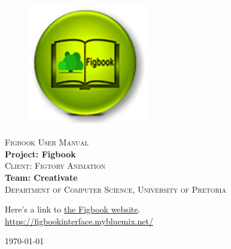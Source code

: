 \begin{titlepage}
	\begin{center}
		
		\begin{figure}[t]
			\centering
			\includegraphics[width=200px]{images/figbooklogo-u216.png}
		\end{figure}
		
		\textsc{\Huge Figbook User Manual} \\ 
		\vspace{2cm}
		\textbf{\Large Project: Figbook} \\ 
		\textsc{\small Client: Figtory Animation} \\ 
		\vspace{2cm}
		\textbf{\large Team: Creativate } \\ 
		
		\textsc{\small Department of Computer Science, University of Pretoria}
		
		\vfill
		
	Here's a link to \href{https://figbookinterface.mybluemix.net/}{the Figbook website}.\\
	\url{https://figbookinterface.mybluemix.net/}

	\vfill

	{\large \today}	
	
		
		
	\end{center}
\end{titlepage}
